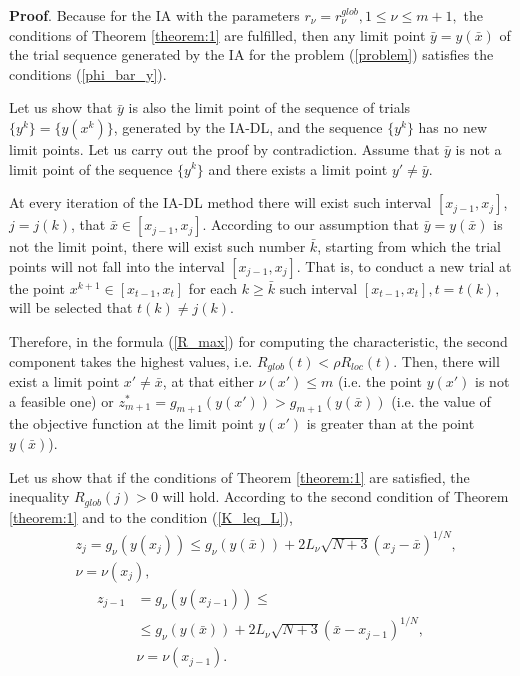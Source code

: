 \documentclass[twocolumn]{svjour3}          %
\begin{document}
\textbf{Proof}. Because for the IA with the parameters $r_{\nu}=r_{\nu}^{glob}, 1 \leq \nu \leq m+1,$ the conditions of Theorem \ref{theorem:1} are fulfilled, then any limit point $\bar{y}=y(\bar{x})$ of the trial sequence generated by the IA for the problem (\ref{problem}) satisfies the conditions (\ref{phi_bar_y}).

	Let us show that $\bar y$ is also the limit point of the sequence of trials $\{y^k\}=\{y(x^k)\}$, generated by the IA-DL, and the sequence $\{y^k\}$ has no new limit points. Let us carry out the proof by contradiction. Assume that $\bar y$ is not a limit point of the sequence $\{y^k\}$ and there exists a limit point $y' \neq \bar y$.

	At every iteration of the IA-DL method there will exist such interval $[x_{j-1}, x_j]$, $j=j(k)$, that $\bar x \in [x_{j-1}, x_j]$. According to our assumption that $\bar y = y(\bar x)$ is not the limit point, there will exist such number $\bar k$, starting from which the trial points will not fall into the interval $[x_{j-1}, x_j]$. That is, to conduct a new trial at the point $x^{k+1} \in [x_{t-1}, x_t]$ for each $k\geq \bar k$ such interval $[x_{t-1}, x_t], t=t(k),$ will be selected that $t(k) \neq j(k)$.

	Therefore, in the formula (\ref{R_max}) for computing the characteristic, the second component takes the highest values, i.e. $ R_{glob}(t) < \rho R_{loc}(t)$.
Then, there will exist a limit point $x' \neq \bar x$, at that either $\nu(x') \leq m$ (i.e. the point $y(x')$ is not a feasible one) or $z_{m+1}^\ast =g_{m+1}(y(x'))>g_{m+1}(y(\bar x))$ (i.e. the value of the objective function at the limit point $y(x')$ is greater than at the point $y(\bar x)$).



	Let us show that if the conditions of Theorem \ref{theorem:1} are satisfied, the inequality $R_{glob}(j)>0$ will hold. According to the second condition of Theorem \ref{theorem:1} and to the condition (\ref{K_leq_L}), 
\begin{align}
	& z_j = g_{\nu}\left( y(x_j) \right) \leq g_{\nu}\left( y(\bar x) \right) + 2L_{\nu}\sqrt{N+3}(x_j-\bar x)^{1/N}, \nonumber \\
	& \nu = \nu(x_j),
\end{align}
\begin{align}
	z_{j-1} & = g_{\nu}\left( y(x_{j-1}) \right) \leq \nonumber \\
	& \leq g_{\nu}\left( y(\bar x) \right) + 2L_{\nu}\sqrt{N+3}(\bar x - x_{j-1})^{1/N}, \nonumber \\
	& \nu = \nu(x_{j-1}).
\end{align}
\end{document}
